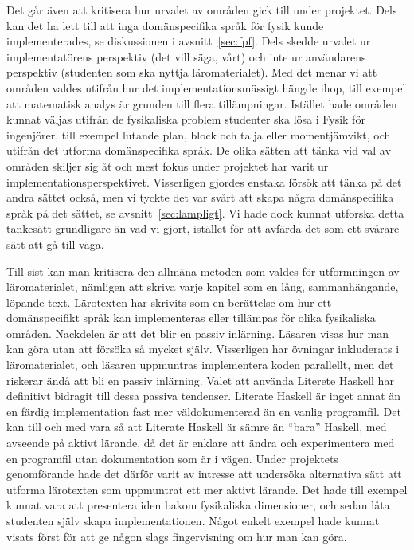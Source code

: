 Det går även att kritisera hur urvalet av områden gick till under projektet.
Dels kan det ha lett till att inga domänspecifika språk för fysik kunde
implementerades, se diskussionen i avsnitt~\ref{sec:fpf}. Dels skedde urvalet ur
implementatörens perspektiv (det vill säga, vårt) och inte ur användarens
perspektiv (studenten som ska nyttja läromaterialet). Med det menar vi att
områden valdes utifrån hur det implementationsmässigt hängde ihop, till exempel
att matematisk analys är grunden till flera tillämpningar. Istället hade områden
kunnat väljas utifrån de fysikaliska problem studenter ska lösa i Fysik för
ingenjörer, till exempel lutande plan, block och talja eller momentjämvikt, och
utifrån det utforma domänspecifika språk. De olika sätten att tänka vid val av
områden skiljer sig åt och mest fokus under projektet har varit ur
implementationsperspektivet. Visserligen gjordes enstaka försök att tänka på det
andra sättet också, men vi tyckte det var svårt att skapa några domänspecifika
språk på det sättet, se avsnitt~\ref{sec:lampligt}. Vi hade dock kunnat utforska
detta tankesätt grundligare än vad vi gjort, istället för att avfärda det som
ett svårare sätt att gå till väga.

Till sist kan man kritisera den allmäna metoden som valdes för utformningen av
läromaterialet, nämligen att skriva varje kapitel som en lång, sammanhängande,
löpande text. Lärotexten har skrivits som en berättelse om hur ett
domänspecifikt språk kan implementeras eller tillämpas för olika fysikaliska
områden. Nackdelen är att det blir en passiv inlärning. Läsaren visas hur man
kan göra utan att försöka så mycket själv. Visserligen har övningar inkluderats
i läromaterialet, och läsaren uppmuntras implementera koden parallellt, men det
riskerar ändå att bli en passiv inlärning. Valet att använda Literete
Haskell har definitivt bidragit till dessa passiva tendenser. Literate Haskell är
inget annat än en färdig implementation fast mer väldokumenterad
än en vanlig programfil. Det kan till och med vara så att Literate
Haskell är sämre än ``bara'' Haskell, med avseende på aktivt lärande, då det är
enklare att ändra och experimentera med en programfil utan dokumentation som är i vägen. Under
projektets genomförande hade det därför varit av intresse att undersöka
alternativa sätt att utforma lärotexten som uppmuntrat ett mer aktivt lärande.
Det hade till exempel kunnat vara att presentera iden bakom fysikaliska
dimensioner, och sedan låta studenten själv skapa implementationen. Något enkelt
exempel hade kunnat visats först för att ge någon slags fingervisning om hur man
kan göra.

